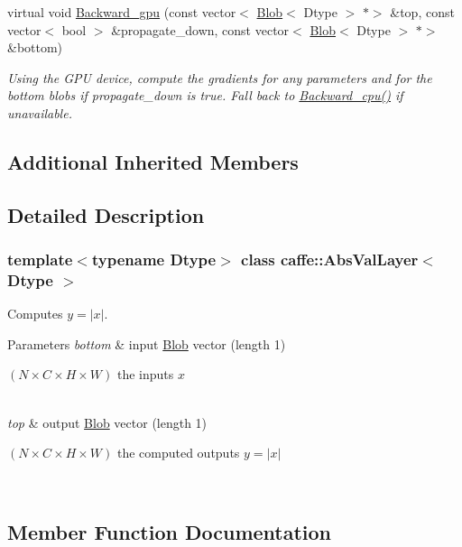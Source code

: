 \begin{DoxyCompactItemize}
virtual void \mbox{\hyperlink{classcaffe_1_1_abs_val_layer_aff44062e9eb243c195285bee25b1eefb}{Backward\+\_\+gpu}} (const vector$<$ \mbox{\hyperlink{classcaffe_1_1_blob}{Blob}}$<$ Dtype $>$ $\ast$$>$ \&top, const vector$<$ bool $>$ \&propagate\+\_\+down, const vector$<$ \mbox{\hyperlink{classcaffe_1_1_blob}{Blob}}$<$ Dtype $>$ $\ast$$>$ \&bottom)
\begin{DoxyCompactList}\small\item\em Using the G\+PU device, compute the gradients for any parameters and for the bottom blobs if propagate\+\_\+down is true. Fall back to \mbox{\hyperlink{classcaffe_1_1_abs_val_layer_abac024a0ee583ecc7d83311363bcfa72}{Backward\+\_\+cpu()}} if unavailable. \end{DoxyCompactList}\end{DoxyCompactItemize}
\subsection*{Additional Inherited Members}


\subsection{Detailed Description}
\subsubsection*{template$<$typename Dtype$>$\newline
class caffe\+::\+Abs\+Val\+Layer$<$ Dtype $>$}

Computes $ y = |x| $. 


\begin{DoxyParams}{Parameters}
{\em bottom} & input \mbox{\hyperlink{classcaffe_1_1_blob}{Blob}} vector (length 1)
\begin{DoxyEnumerate}
\item $ (N \times C \times H \times W) $ the inputs $ x $ 
\end{DoxyEnumerate}\\
\hline
{\em top} & output \mbox{\hyperlink{classcaffe_1_1_blob}{Blob}} vector (length 1)
\begin{DoxyEnumerate}
\item $ (N \times C \times H \times W) $ the computed outputs $ y = |x| $ 
\end{DoxyEnumerate}\\
\hline
\end{DoxyParams}


\subsection{Member Function Documentation}
\mbox{\label{classcaffe_1_1_abs_val_layer_abac024a0ee583ecc7d83311363bcfa72}} 
